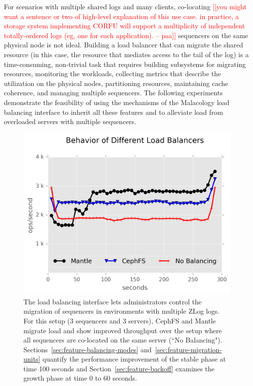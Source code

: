 \documentclass[preprint]{sigplanconf-eurosys}
\newcommand{\paa}[1]{{\textcolor{red}{[[#1 -- paa]]}}}
\begin{document}
For scenarios with multiple shared logs and many clients, co-locating
\paa{you might want a sentence or two of high-level explanation of this use case.
in practice, a storage system implementing CORFU will support a multiplicity of independent
totally-ordered logs (eg, one for each application).}
sequencers on the same physical node is not ideal. Building a
load balancer that can migrate the shared resource (in this case, the resource
that mediates access to the tail of the log) is a time-consuming, non-trivial task that requires building subsystems
for migrating resources, monitoring the workloads, collecting metrics that
describe the utilization on the physical nodes, partitioning resources,
maintaining cache coherence, and managing multiple sequencers. The following
experiments demonstrate the feasibility of using the mechanisms of the
Malacology load balancing interface to inherit all these features and to
alleviate load from overloaded servers with multiple sequencers.

\begin{figure}[t!]
\centering
\includegraphics{figures/mantle-balancer-behaviors.png}
\caption{The load balancing interface lets administrators control the migration
of sequencers in environments with multiple ZLog logs. For this setup (3
sequencers and 3 servers), CephFS and Mantle migrate load and show improved
throughput over the setup where all sequencers are co-located on the same
server (``No Balancing").  Sections~\ref{sec:feature-balancing-modes}
and~\ref{sec:feature-migration-units} quantify the performance improvement of
the stable phase at time 100 seconds and Section~\ref{sec:feature-backoff}
examines the growth phase at time 0 to 60 seconds.
}\label{fig:mantle-balancer-behaviors}
\end{figure}
\end{document}

